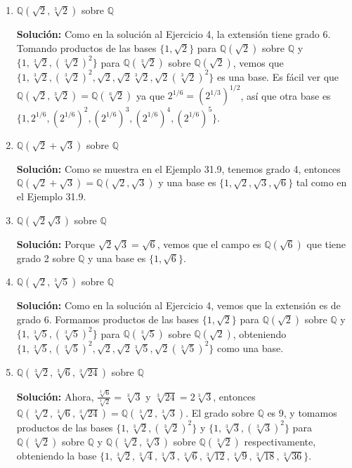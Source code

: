 \begin{enumerate}
    \item \( \mathbb{Q}(\sqrt{2}, \sqrt[3]{2}) \) sobre \( \mathbb{Q} \)

    \textbf{Solución:} Como en la solución al Ejercicio 4, la extensión tiene grado 6. Tomando productos de las bases \(\{1, \sqrt{2}\}\) para \( \mathbb{Q}(\sqrt{2}) \) sobre \( \mathbb{Q} \) y \(\{1, \sqrt[3]{2}, (\sqrt[3]{2})^2\}\) para \( \mathbb{Q}(\sqrt[3]{2}) \) sobre \( \mathbb{Q}(\sqrt{2})\), vemos que \(\{1, \sqrt[3]{2}, (\sqrt[3]{2})^2, \sqrt{2}, \sqrt{2}\sqrt[3]{2}, \sqrt{2}(\sqrt[3]{2})^2\}\) es una base. Es fácil ver que \( \mathbb{Q}(\sqrt{2}, \sqrt[3]{2}) = \mathbb{Q}(\sqrt[6]{2}) \) ya que \( 2^{1/6} = (2^{1/3})^{1/2} \), así que otra base es \(\{1, 2^{1/6}, (2^{1/6})^2, (2^{1/6})^3, (2^{1/6})^4, (2^{1/6})^5\}\).

    \item \( \mathbb{Q}(\sqrt{2} + \sqrt{3}) \) sobre \( \mathbb{Q} \)

    \textbf{Solución:} Como se muestra en el Ejemplo 31.9, tenemos grado 4, entonces \( \mathbb{Q}(\sqrt{2} + \sqrt{3}) = \mathbb{Q}(\sqrt{2}, \sqrt{3}) \) y una base es \(\{1, \sqrt{2}, \sqrt{3}, \sqrt{6}\}\) tal como en el Ejemplo 31.9.

    \item \( \mathbb{Q}(\sqrt{2}\sqrt{3}) \) sobre \( \mathbb{Q} \)

    \textbf{Solución:} Porque \( \sqrt{2}\sqrt{3} = \sqrt{6} \), vemos que el campo es \( \mathbb{Q}(\sqrt{6}) \) que tiene grado 2 sobre \( \mathbb{Q} \) y una base es \(\{1, \sqrt{6}\}\).

    \item \( \mathbb{Q}(\sqrt{2}, \sqrt[3]{5}) \) sobre \( \mathbb{Q} \)

    \textbf{Solución:} Como en la solución al Ejercicio 4, vemos que la extensión es de grado 6. Formamos productos de las bases \(\{1, \sqrt{2}\}\) para \( \mathbb{Q}(\sqrt{2}) \) sobre \( \mathbb{Q} \) y \(\{1, \sqrt[3]{5}, (\sqrt[3]{5})^2\}\) para \( \mathbb{Q}(\sqrt[3]{5}) \) sobre \( \mathbb{Q}(\sqrt{2})\), obteniendo \(\{1, \sqrt[3]{5}, (\sqrt[3]{5})^2, \sqrt{2}, \sqrt{2}\sqrt[3]{5}, \sqrt{2}(\sqrt[3]{5})^2\}\) como una base.

    \item \( \mathbb{Q}(\sqrt[3]{2}, \sqrt[3]{6}, \sqrt[3]{24}) \) sobre \( \mathbb{Q} \)

    \textbf{Solución:} Ahora, \( \frac{\sqrt[3]{6}}{\sqrt[3]{2}} = \sqrt[3]{3} \) y \( \sqrt[3]{24} = 2\sqrt[3]{3} \), entonces \( \mathbb{Q}(\sqrt[3]{2}, \sqrt[3]{6}, \sqrt[3]{24}) = \mathbb{Q}(\sqrt[3]{2}, \sqrt[3]{3}) \). El grado sobre \( \mathbb{Q} \) es 9, y tomamos productos de las bases \(\{1, \sqrt[3]{2}, (\sqrt[3]{2})^2\}\) y \(\{1, \sqrt[3]{3}, (\sqrt[3]{3})^2\}\) para \( \mathbb{Q}(\sqrt[3]{2}) \) sobre \( \mathbb{Q} \) y \( \mathbb{Q}(\sqrt[3]{2}, \sqrt[3]{3}) \) sobre \( \mathbb{Q}(\sqrt[3]{2}) \) respectivamente, obteniendo la base \(\{1, \sqrt[3]{2}, \sqrt[3]{4}, \sqrt[3]{3}, \sqrt[3]{6}, \sqrt[3]{12}, \sqrt[3]{9}, \sqrt[3]{18}, \sqrt[3]{36}\}\).


\end{enumerate}
